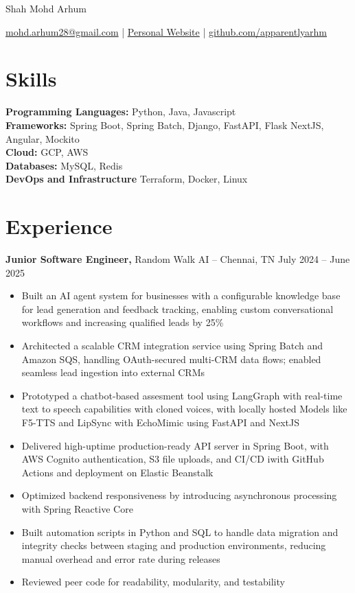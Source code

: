\documentclass[11pt]{article}       %
\begin{document}
\centerline{\Huge Shah Mohd Arhum}

\vspace{5pt}

\centerline{\href{mailto:mohd.arhum28@gmail.com}{mohd.arhum28@gmail.com} | \href{https://arhm.dev/}{Personal Website} | \href{https://github.com/apparentlyarhm}{github.com/apparentlyarhm}}

\vspace{-10pt}

\section*{Skills}
\textbf{Programming Languages:} Python, Java, Javascript \\
\textbf{Frameworks:} Spring Boot, Spring Batch, Django, FastAPI, Flask NextJS, Angular, Mockito \\
\textbf{Cloud:} GCP, AWS \\
\textbf{Databases:} MySQL, Redis \\
\textbf{DevOps and Infrastructure} Terraform, Docker, Linux

\vspace{-6.5pt}

\section*{Experience}
\textbf{Junior Software Engineer,} {Random Walk AI} -- Chennai, TN \hfill July 2024 -- June 2025 \\
\vspace{-9pt}
\begin{itemize}
    \item Built an AI agent system for businesses with a configurable knowledge base for lead generation and feedback tracking, enabling custom conversational workflows and increasing qualified leads by 25\%
    \item Architected a scalable CRM integration service using Spring Batch and Amazon SQS, handling OAuth-secured multi-CRM data flows; enabled seamless lead ingestion into external CRMs
    \item Prototyped a chatbot-based assesment tool using LangGraph with real-time text to speech capabilities with cloned voices, with locally hosted Models like F5-TTS and LipSync with EchoMimic using FastAPI and NextJS
    \item Delivered high-uptime production-ready API server in Spring Boot, with AWS Cognito authentication, S3 file uploads, and CI/CD iwith GitHub Actions and deployment on Elastic Beanstalk    \item Optimized backend responsiveness by introducing asynchronous processing with Spring Reactive Core 
    \item Built automation scripts in Python and SQL to handle data migration and integrity checks between staging and production environments, reducing manual overhead and error rate during releases
    \item Reviewed peer code for readability, modularity, and testability

\end{itemize}
\end{document}
